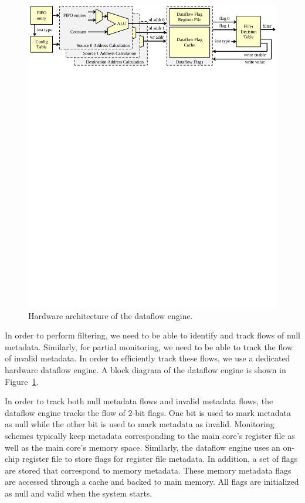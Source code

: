 \begin{figure}
  \begin{center}
    \includegraphics[width=\linewidth]{figs/dataflow_architecture.pdf}
    \vspace{-0.2in}
    \caption{Hardware architecture of the dataflow engine.}
    \label{fig:arch.dataflow} 
    \vspace{-0.1in}
  \end{center}
\end{figure}

In order to perform filtering, we need to be able to identify and track flows
of null metadata. Similarly, for partial monitoring,
 we need to be able to track the flow of invalid metadata. In
order to efficiently track these flows, we use a dedicated hardware
dataflow engine. A block diagram of the dataflow engine is shown in
Figure~\ref{fig:arch.dataflow}.

In order to track both null metadata flows and invalid metadata flows, the
dataflow engine tracks the flow of 2-bit flags. One bit is used to
mark metadata as null while the other bit is used to mark metadata as invalid.
Monitoring schemes typically keep metadata corresponding to the main core's
register file as well as the main core's memory space. Similarly, the dataflow
engine uses an on-chip register file to store flags for register file metadata.
In addition, a set of flags are stored that correspond to memory metadata.
These memory metadata flags are accessed through a cache and backed to main
memory. All flags are initialized as null and valid when the system starts. 

